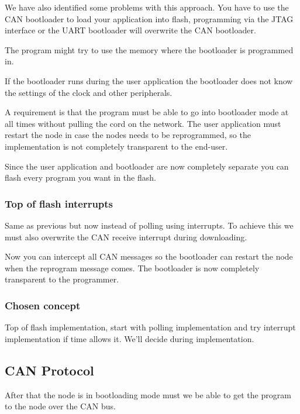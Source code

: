 \documentclass[twocolumn]{article}
\begin{document}
			We have also identified some problems with this approach.
			You have to use the CAN bootloader to load your application into flash,
			programming via the JTAG interface or the UART bootloader will overwrite the CAN bootloader.
			
			The program might try to use the memory where the bootloader is programmed in.
			
			If the bootloader runs during the user application the bootloader does not know the settings of the clock and other peripherals.
			
			A requirement is that the program must be able to go into bootloader mode at all times without pulling the cord on the network.
			The user application must restart the node in case the nodes needs to be reprogrammed,
			so the implementation is not completely transparent to the end-user.
			
			Since the user application and bootloader are now completely separate you can flash every program you want in the flash.
			
		\subsubsection*{Top of flash interrupts}
			Same as previous but now instead of polling using interrupts.
			To achieve this we must also overwrite the CAN receive interrupt during downloading.
			
			Now you can intercept all CAN messages so the bootloader can restart the node when the reprogram message comes.
			The bootloader is now completely transparent to the programmer.
		
		\subsubsection*{Chosen concept}
			Top of flash implementation,
			start with polling implementation and try interrupt implementation if time allows it.
			We'll decide during implementation.
	
	\subsection*{CAN Protocol}
		After that the node is in bootloading mode must we be able to get the program to the node over the CAN bus.
		
		
\end{document}
